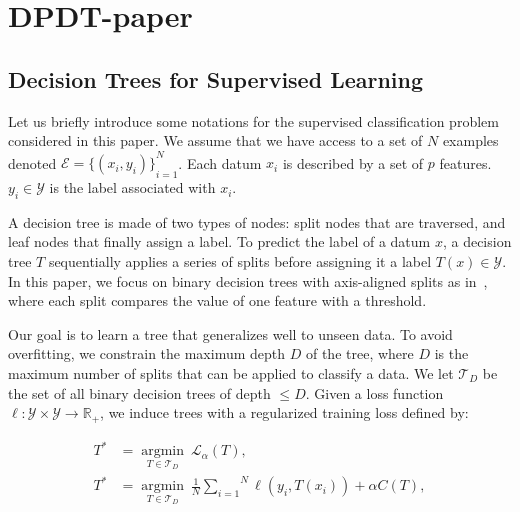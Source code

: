 \chapter{DPDT-paper}

\section{Decision Trees for Supervised Learning}


Let us briefly introduce some notations for the supervised classification problem considered in this paper.
We assume that we have access to a set of $N$ examples denoted $\mathcal{E} = {\{(x_i, y_i)\}}_{i=1}^N$. Each datum $x_i$ is described by a set of $p$ features. $y_i \in {\mathcal Y}$ is the label associated with $x_i$.

A decision tree is made of two types of nodes: split nodes that are traversed, and leaf nodes that finally assign a label.
To predict the label of a datum $x$, a decision tree $T$ sequentially applies a series of splits before assigning it a label $T(x) \in \mathcal Y$.
In this paper, we focus on binary decision trees with axis-aligned splits as in~\cite{breiman1984classification}, where each split compares the value of one feature with a threshold. 

Our goal is to learn a tree that generalizes well to unseen data. To avoid overfitting, we constrain the maximum depth $D$ of the tree, where $D$ is the maximum number of splits that can be applied to classify a data. We let $\mathcal{T}_{D}$ be the set of all binary decision trees of depth $\leq D$. Given a loss function ${\ell}: \mathcal{Y} \times \mathcal{Y} \rightarrow \mathbb{R}_+$, we induce trees with a regularized training loss defined by:

\begin{align}
    T^* &= \underset{T \in \mathcal{T}_D}{\operatorname{argmin}}\ {\mathcal L}_\alpha(T), \nonumber \\
    T^* &= \underset{T \in \mathcal{T}_D}{\operatorname{argmin}}\ \frac{1}{N}\overset{N}{\underset{i=1}{\sum}}{\ell}(y_i, T(x_i)) + \alpha C(T),
    \label{eq:suplearning}
\end{align}

